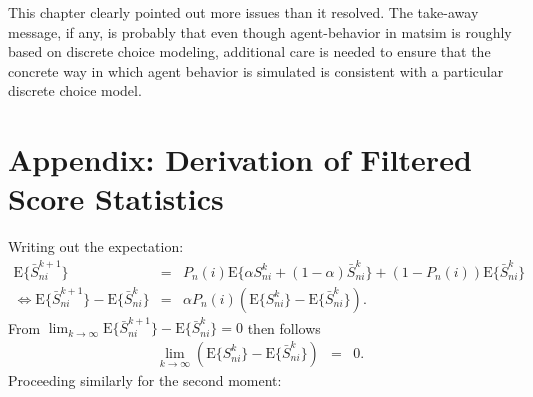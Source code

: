 This chapter clearly pointed out more issues than it resolved. The take-away message,
if any, is probably that even though agent-behavior in \gls{matsim} is roughly based
on discrete choice modeling, additional care is needed to ensure that the concrete way 
in which agent behavior is simulated is consistent with a particular discrete choice model.


\section*{Appendix: Derivation of Filtered Score Statistics}

Writing out the expectation:
\begin{eqnarray}
\text{E}\{\bar{S}_{ni}^{k+1}\} & = & P_{n}(i)\text{E}\{\alpha S_{ni}^{k}+(1-\alpha)\bar{S}_{ni}^{k}\}+(1-P_{n}(i))\text{E}\{\bar{S}_{ni}^{k}\}\\
\Leftrightarrow\text{E}\{\bar{S}_{ni}^{k+1}\}-\text{E}\{\bar{S}_{ni}^{k}\} & = & \alpha P_{n}(i)(\text{E}\{S_{ni}^{k}\}-\text{E}\{\bar{S}_{ni}^{k}\}).
\end{eqnarray}
From $\lim_{k\rightarrow\infty}\text{E}\{\bar{S}_{ni}^{k+1}\}-\text{E}\{\bar{S}_{ni}^{k}\}=0$
then follows
\begin{eqnarray}
\lim_{k\rightarrow\infty}\left(\text{E}\{S_{ni}^{k}\}-\text{E}\{\bar{S}_{ni}^{k}\}\right) & = & 0. \label{eq:first-score-moment}
\end{eqnarray}
%
Proceeding similarly for the second moment:
